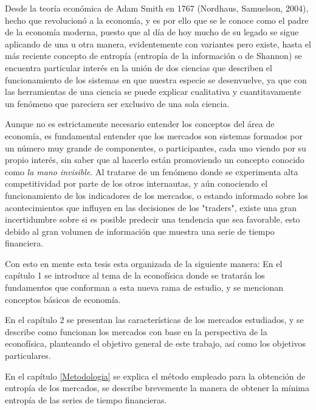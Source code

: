 Desde la teor\'ia econ\'omica de Adam Smith en 1767 (Nordhaus, Samuelson, 2004), hecho que revolucion\'o a la econom\'ia, y es por ello que se le conoce como el padre de la econom\'ia moderna, puesto que al d\'ia de hoy mucho de su legado se sigue aplicando de una u otra manera, evidentemente con variantes pero existe, hasta el más reciente concepto de entropía (entropía de la información o de Shannon) se encuentra particular interés en la unión de dos ciencias que describen el funcionamiento de los sistemas en que nuestra especie se desenvuelve, ya que con las herramientas de una ciencia se puede explicar cualitativa y cuantitavamente un fenómeno que pareciera ser exclusivo de una sola ciencia.
\newline

Aunque no es estrictamente necesario entender los conceptos del \'area de econom\'ia, es fundamental entender que los mercados son sistemas formados por un n\'umero muy grande de componentes, o participantes, cada uno viendo por su propio inter\'es, sin saber que al hacerlo est\'an promoviendo un concepto conocido como \textit{la mano invisible}. Al tratarse de un fen\'omeno donde se experimenta alta competitividad por parte de los otros internautas, y a\'un conociendo el funcionamiento de los indicadores de los mercados, o estando informado sobre los acontecimientos que influyen en las decisiones de los "traders", existe una gran incertidumbre sobre si es posible predecir una tendencia que sea favorable, esto debido al gran volumen de información que muestra una serie de tiempo financiera. 
\newline

Con esto en mente esta tesis esta organizada de la siguiente manera:\newline 
En el capítulo 1 se introduce al tema de la econofísica donde se tratarán los fundamentos que conforman a esta nueva rama de estudio, y se mencionan conceptos básicos de economía.
\newline

En el capítulo 2 se presentan las características de los mercados estudiados, y se describe como funcionan los mercados con base en la perspectiva de la econofísica, planteando el objetivo general de este trabajo, así como los objetivos particulares.\newline

En el capítulo \ref{Metodologia} se explica el método empleado para la obtención de entropía de los mercados, se describe brevemente la manera de obtener la mínima entropía de las series de tiempo financieras.
\newline

